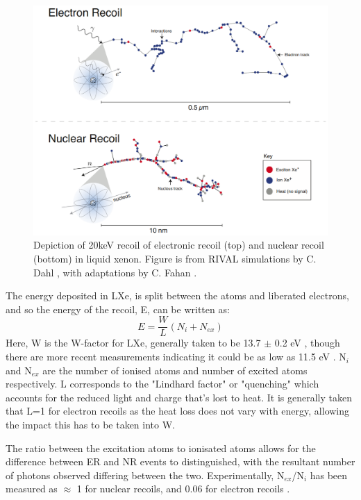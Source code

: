 \begin{figure}
    \centering
    \includegraphics[width=\textwidth]{Figures/LZ/er_nr_tracks.png}
    \caption[Depiction of a 20keV recoil on liquid xenon]{Depiction of 20keV recoil of electronic recoil (top) and nuclear recoil (bottom) in liquid xenon.
    Figure is from RIVAL simulations by C. Dahl \cite{carldahl_thesis_ref}, with adaptations by C. Fahan \cite{carlosfahan_thesis_ref}.}
    \label{fig:er_nr_tracks}
\end{figure}

\par
The energy deposited in LXe, is split between the atoms and liberated electrons, and so the energy of the recoil, E, can be written as:
\begin{equation}
    E = \frac{W}{L}(N_i + N_{ex})
\end{equation}
Here, W is the W-factor for LXe, generally taken to be 13.7 $\pm$ 0.2 eV \cite{light_and_charge_of_xenon_ref}, though there are more recent measurements indicating it could be as low as 11.5 eV \cite{electron_excitation_energy_of_xenon_ref}. 
N$_i$ and N$_{ex}$ are the number of ionised atoms and number of excited atoms respectively.
L corresponds to the "Lindhard factor" or "quenching" which accounts for the reduced light and charge that's lost to heat.
It is generally taken that L=1 for electron recoils as the heat loss does not vary with energy, allowing the impact this has to be taken into W.
\par
The ratio between the excitation atoms to ionisated atoms allows for the difference between ER and NR events to distinguished, with the resultant number of photons observed differing between the two.
Experimentally, N$_{ex}$/N$_i$ has been measured as $\approx$ 1 for nuclear recoils, and 0.06 for electron recoils \cite{ionisation_to_excitation_ratio_xenon_ref}.

